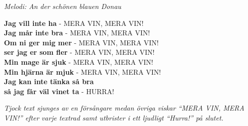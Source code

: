 {\footnotesize\textit{Melodi: An der schönen blauen Donau}}\par
\vspace{10pt}
\textbf{Jag vill inte ha} - MERA VIN, MERA VIN!\\
\textbf{Jag mår inte bra} - MERA VIN, MERA VIN!\\
\textbf{Om ni ger mig mer} - MERA VIN, MERA VIN!\\
\textbf{ser jag er som fler} - MERA VIN, MERA VIN!\\
\textbf{Min mage är sjuk} - MERA VIN, MERA VIN!\\
\textbf{Min hjärna är mjuk} - MERA VIN, MERA VIN!\\
\textbf{Jag kan inte tänka så bra}\\
\textbf{så jag får väl vinet ta} - HURRA!\par
\vspace{10pt}
{\footnotesize\textit{Tjock text sjunges av en försångare medan övriga viskar ``MERA VIN, MERA VIN!'' efter varje textrad samt utbrister i ett ljudligt ``Hurra!'' på slutet.}}
